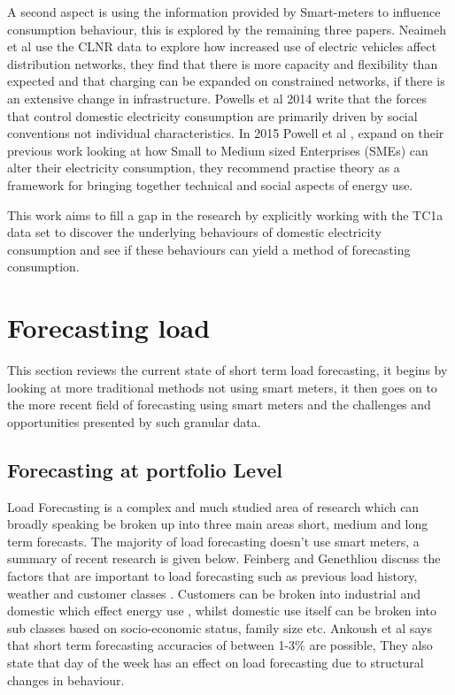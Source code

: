 A second aspect is using the information provided by Smart-meters to influence consumption behaviour, this is explored by the remaining three papers. 
Neaimeh et al \cite{neaimeh2015} use the CLNR data to explore how increased use of electric vehicles affect distribution networks, they find that there is more capacity and flexibility than expected and that charging can be expanded on constrained networks, if there is an extensive change in infrastructure. Powells et al 2014 \cite{powells2014} write that the forces that control domestic electricity consumption are primarily driven by social conventions not individual characteristics. In 2015 Powell et al \cite{powells2015}, expand on their previous work looking at how Small to Medium sized Enterprises (SMEs) can alter their electricity consumption, they recommend practise theory as a framework for bringing together technical and social aspects of energy use.

This work aims to fill a gap in the research by explicitly working with the TC1a data set to discover the underlying behaviours of domestic electricity consumption and see if these behaviours can yield a method of forecasting consumption.


\section{Forecasting load}
\label{lit:load}

This section reviews the current state of short term load forecasting, it begins by looking at more traditional methods not using smart meters, it then goes on to the more recent field of forecasting using smart meters and the challenges and opportunities presented by such granular data.

\subsection{Forecasting at portfolio Level}
Load Forecasting is a complex and much studied area of research which can broadly speaking be broken up into three main areas short, medium and long term forecasts. The majority of load forecasting doesn't use smart meters, a summary of recent research is given below. Feinberg and Genethliou \cite{feinberg} discuss the factors that are important to load forecasting such as previous load history, weather and customer classes \cite{Hussain2014}. Customers can be broken into industrial and domestic which effect energy use \cite{homesshowgreatestseasonalvariationinelectricityusetodayinenergyusenergyinformationadministrationeia2013}, whilst domestic use itself can be broken into sub classes based on socio-economic status, family size etc. Ankoush et al \cite{Ankush2015} says that short term forecasting accuracies of between 1-3\% are possible, They also state that day of the week has an effect on load forecasting due to structural changes in behaviour. 

